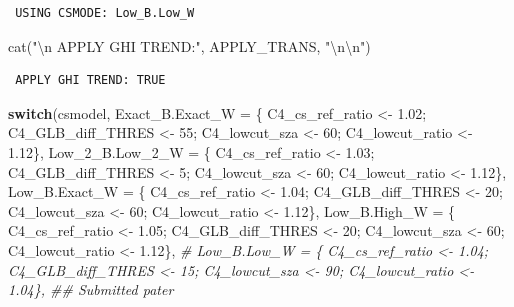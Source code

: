 \documentclass[
  10pt,
  a4paper,oneside]{article}
\newenvironment{Shaded}{\begin{snugshade}}{\end{snugshade}}
\newcommand{\AttributeTok}[1]{\textcolor[rgb]{0.77,0.63,0.00}{#1}}
\newcommand{\CommentTok}[1]{\textcolor[rgb]{0.56,0.35,0.01}{\textit{#1}}}
\newcommand{\ControlFlowTok}[1]{\textcolor[rgb]{0.13,0.29,0.53}{\textbf{#1}}}
\newcommand{\DecValTok}[1]{\textcolor[rgb]{0.00,0.00,0.81}{#1}}
\newcommand{\FloatTok}[1]{\textcolor[rgb]{0.00,0.00,0.81}{#1}}
\newcommand{\FunctionTok}[1]{\textcolor[rgb]{0.00,0.00,0.00}{#1}}
\newcommand{\NormalTok}[1]{#1}
\newcommand{\OtherTok}[1]{\textcolor[rgb]{0.56,0.35,0.01}{#1}}
\newcommand{\SpecialCharTok}[1]{\textcolor[rgb]{0.00,0.00,0.00}{#1}}
\newcommand{\StringTok}[1]{\textcolor[rgb]{0.31,0.60,0.02}{#1}}
\begin{document}
\begin{verbatim}
 USING CSMODE: Low_B.Low_W 
\end{verbatim}

\begin{Shaded}
\begin{Highlighting}[]
\FunctionTok{cat}\NormalTok{(}\StringTok{"}\SpecialCharTok{\textbackslash{}n}\StringTok{ APPLY GHI TREND:"}\NormalTok{, APPLY\_TRANS, }\StringTok{"}\SpecialCharTok{\textbackslash{}n\textbackslash{}n}\StringTok{"}\NormalTok{)}
\end{Highlighting}
\end{Shaded}

\begin{verbatim}
 APPLY GHI TREND: TRUE 
\end{verbatim}

\begin{Shaded}
\begin{Highlighting}[]
\ControlFlowTok{switch}\NormalTok{(csmodel,}
       \AttributeTok{Exact\_B.Exact\_W =}\NormalTok{ \{ C4\_cs\_ref\_ratio }\OtherTok{\textless{}{-}} \FloatTok{1.02}\NormalTok{; C4\_GLB\_diff\_THRES }\OtherTok{\textless{}{-}} \DecValTok{55}\NormalTok{; C4\_lowcut\_sza }\OtherTok{\textless{}{-}} \DecValTok{60}\NormalTok{; C4\_lowcut\_ratio }\OtherTok{\textless{}{-}} \FloatTok{1.12}\NormalTok{\},}
       \AttributeTok{Low\_2\_B.Low\_2\_W =}\NormalTok{ \{ C4\_cs\_ref\_ratio }\OtherTok{\textless{}{-}} \FloatTok{1.03}\NormalTok{; C4\_GLB\_diff\_THRES }\OtherTok{\textless{}{-}}  \DecValTok{5}\NormalTok{; C4\_lowcut\_sza }\OtherTok{\textless{}{-}} \DecValTok{60}\NormalTok{; C4\_lowcut\_ratio }\OtherTok{\textless{}{-}} \FloatTok{1.12}\NormalTok{\},}
       \AttributeTok{Low\_B.Exact\_W   =}\NormalTok{ \{ C4\_cs\_ref\_ratio }\OtherTok{\textless{}{-}} \FloatTok{1.04}\NormalTok{; C4\_GLB\_diff\_THRES }\OtherTok{\textless{}{-}} \DecValTok{20}\NormalTok{; C4\_lowcut\_sza }\OtherTok{\textless{}{-}} \DecValTok{60}\NormalTok{; C4\_lowcut\_ratio }\OtherTok{\textless{}{-}} \FloatTok{1.12}\NormalTok{\},}
       \AttributeTok{Low\_B.High\_W    =}\NormalTok{ \{ C4\_cs\_ref\_ratio }\OtherTok{\textless{}{-}} \FloatTok{1.05}\NormalTok{; C4\_GLB\_diff\_THRES }\OtherTok{\textless{}{-}} \DecValTok{20}\NormalTok{; C4\_lowcut\_sza }\OtherTok{\textless{}{-}} \DecValTok{60}\NormalTok{; C4\_lowcut\_ratio }\OtherTok{\textless{}{-}} \FloatTok{1.12}\NormalTok{\},}
       \CommentTok{\# Low\_B.Low\_W     = \{ C4\_cs\_ref\_ratio \textless{}{-} 1.04; C4\_GLB\_diff\_THRES \textless{}{-} 15; C4\_lowcut\_sza \textless{}{-} 90; C4\_lowcut\_ratio \textless{}{-} 1.04\}, \#\# Submitted pater}

\end{Highlighting}
\end{Shaded}
\end{document}
